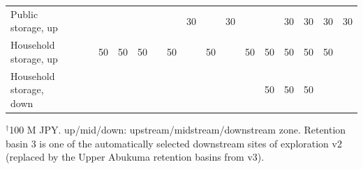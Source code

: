 \begin{table}[tbp]
\begin{tabular}{@{}lcccccccccccccccc@{}}
Public storage, up &  &  &  &  &  &  &  & 30 &  & 30 &  &  & 30 & 30 & 30 & 30 \\
Household storage, up &  &  & 50 & 50 & 50 &  & 50 &  & 50 &  & 50 & 50 & 50 & 50 & 50 &  \\
Household storage, down &  &  &  &  &  &  &  &  &  &  &  & 50 & 50 & 50 &  &  \\
\bottomrule
\end{tabular}
\par\footnotesize\raggedright $^{\dagger}$100 M JPY. up/mid/down: upstream/midstream/downstream zone. Retention basin 3 is one of the automatically selected downstream sites of exploration v2 (replaced by the Upper Abukuma retention basins from v3).
\end{table}
